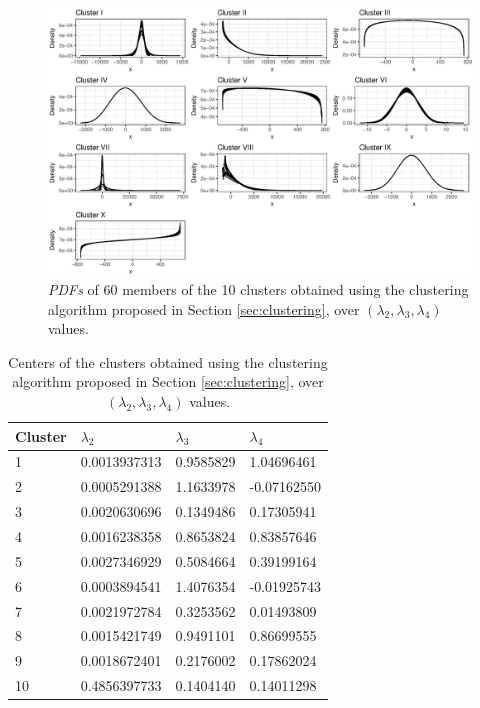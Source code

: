 \begin{figure}[H]
    \centering
    \includegraphics[width=\textwidth]{img/use_cases/clusters.eps}
    \caption{\textit{PDFs} of 60 members of the 10 clusters obtained using the clustering algorithm proposed in Section \ref{sec:clustering}, over $(\lambda_{2}, \lambda_{3}, \lambda_{4})$ values.}
    \label{fig:cluster1}
\end{figure}

\begin{table}[H]
\begin{center}
    \begin{tabular}{|l|l|l|l|}
    \hline
    \textbf{Cluster} & $\lambda_{2}$ & $\lambda_{3}$ & $\lambda_{4}$         \\ \hline
    1     & 0.0013937313 & 0.9585829 & 1.04696461              \\ \hline
    2     & 0.0005291388 & 1.1633978 & -0.07162550            \\ \hline
    3     & 0.0020630696 & 0.1349486 & 0.17305941            \\ \hline
    4     &  0.0016238358 & 0.8653824 & 0.83857646               \\ \hline
    5     & 0.0027346929 & 0.5084664 & 0.39199164                \\ \hline
    6     & 0.0003894541 & 1.4076354 & -0.01925743               \\ \hline
    7     & 0.0021972784 & 0.3253562 & 0.01493809                 \\ \hline
    8     & 0.0015421749 & 0.9491101 & 0.86699555                \\ \hline
    9     & 0.0018672401 & 0.2176002 & 0.17862024            \\ \hline
    10   & 0.4856397733 & 0.1404140 & 0.14011298             \\ \hline
    \end{tabular}
    \caption {Centers of the clusters obtained using the clustering algorithm proposed in Section \ref{sec:clustering}, over $(\lambda_{2}, \lambda_{3}, \lambda_{4})$ values.}
    \label{tab:center_of_the_clusters}
    \end{center}
\end{table}

